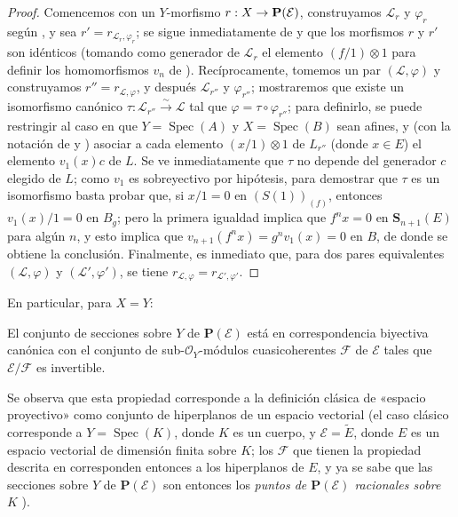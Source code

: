 \documentclass[oneside,10pt]{amsart}
\makeatletter
\newcommand{\ega@arrow}[2]{\mathchoice{#1}{#2}{#2}{#2}}
\renewcommand{\to}{\ega@arrow{\longrightarrow}{\rightarrow}}
\newcommand{\oldpage}[2][]{\marginnote{\normalfont\footnotesize\textbf{#1}~|~#2}\ignorespaces}
\let\EGAOriginalLabel\label
\renewcommand{\label}[1]{\phantomsection\EGAOriginalLabel{#1}}
\makeatother
\begin{document}
\begin{proof}
Comencemos con un $Y$-morfismo $r:X\to\mathbf{P}(\mathcal{E})$, construyamos $\mathcal{L}_r$ y $\varphi_r$ según , y sea $r'=r_{\mathcal{L}_r,\varphi_r}$;
se sigue inmediatamente de  y  que los morfismos $r$ y $r'$ son idénticos (tomando como generador de $\mathcal{L}_r$ el elemento $(f/1)\otimes1$ para definir los homomorfismos $v_n$ de ).
Recíprocamente, tomemos un par $(\mathcal{L},\varphi)$ y construyamos
\oldpage[II]{74}
$r''=r_{\mathcal{L},\varphi}$, y después $\mathcal{L}_{r''}$ y $\varphi_{r''}$;
mostraremos que existe un isomorfismo canónico $\tau:\mathcal{L}_{r''}\xrightarrow{\sim}\mathcal{L}$ tal que $\varphi=\tau\circ\varphi_{r''}$;
para definirlo, se puede restringir al caso en que $Y=\operatorname{Spec}(A)$ y $X=\operatorname{Spec}(B)$ sean afines, y (con la notación de  y ) asociar a cada elemento $(x/1)\otimes1$ de $L_{r''}$ (donde $x\in E$) el elemento $v_1(x)c$ de $L$.
Se ve inmediatamente que $\tau$ no depende del generador $c$ elegido de $L$;
como $v_1$ es sobreyectivo por hipótesis, para demostrar que $\tau$ es un isomorfismo basta probar que, si $x/1=0$ en $(S(1))_{(f)}$, entonces $v_1(x)/1=0$ en $B_g$;
pero la primera igualdad implica que $f^nx=0$ en $\mathbf{S}_{n+1}(E)$ para algún $n$, y esto implica que $v_{n+1}(f^nx)=g^nv_1(x)=0$ en $B$, de donde se obtiene la conclusión.
Finalmente, es inmediato que, para dos pares equivalentes $(\mathcal{L},\varphi)$ y $(\mathcal{L}',\varphi')$, se tiene $r_{\mathcal{L},\varphi}=r_{\mathcal{L}',\varphi'}$.
\end{proof}

En particular, para $X=Y$:
\begin{theorem}[4.2.4]
\label{II.4.2.4-fr}
El conjunto de secciones sobre $Y$ de $\mathbf{P}(\mathcal{E})$ está en correspondencia biyectiva canónica con el conjunto de sub-$\mathcal{O}_Y$-módulos cuasicoherentes $\mathcal{F}$ de $\mathcal{E}$ tales que $\mathcal{E}/\mathcal{F}$ es invertible.
\end{theorem}

Se observa que esta propiedad corresponde a la definición clásica de «espacio proyectivo» como conjunto de hiperplanos de un espacio vectorial (el caso clásico corresponde a $Y=\operatorname{Spec}(K)$, donde $K$ es un cuerpo, y $\mathcal{E}=\widetilde{E}$, donde $E$ es un espacio vectorial de dimensión finita sobre $K$; los $\mathcal{F}$ que tienen la propiedad descrita en  corresponden entonces a los hiperplanos de $E$, y ya se sabe que las secciones sobre $Y$ de $\mathbf{P}(\mathcal{E})$ son entonces los \emph{puntos de $\mathbf{P}(\mathcal{E})$ racionales sobre} $K$ ).
\end{document}
